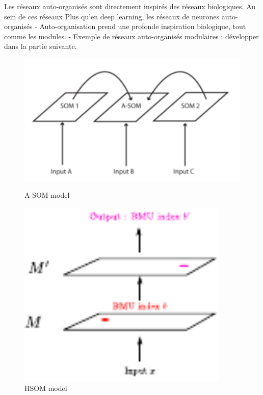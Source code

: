 Les réseaux auto-organisés sont directement inspirés des réseaux biologiques. Au sein de ces réseaux
Plus qu'en deep learning, les réseaux de neurones auto-organisés
- Auto-organisation prend une profonde inspiration biologique, tout comme les modules.
- Exemple de réseaux auto-organisés modulaires : développer dans la partie suivante.
\begin{figure}
\begin{minipage}{0.5\textwidth}

\includegraphics[width=\textwidth]{asom}
\caption{A-SOM model \cite{johnsson_associative_2009}}
\end{minipage}
\begin{minipage}{0.5\textwidth}
\includegraphics[width=0.9\textwidth]{hsom}
\caption{HSOM model \cite{LampinenClusteringPO}}

\end{minipage}
\end{figure}
\cite{LampinenClusteringPO}

